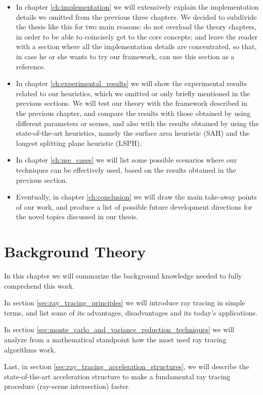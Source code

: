 \documentclass{PoliMi_MasterThesis}
\begin{document}
\begin{itemize}
\begin{itemize}
	\end{itemize}
	\item In chapter \ref{ch:implementation} we will extensively explain the implementation details we omitted from the previous three chapters. We decided to subdivide the thesis like this for two main reasons: do not overload the theory chapters, in order to be able to coincisely get to the core concepts; and leave the reader with a section where all the implementation details are concentrated, so that, in case he or she wants to try our framework, can use this section as a reference.
	\item In chapter \ref{ch:experimental_results} we will show the experimental results related to our heuristics, which we omitted or only briefly mentioned in the previous sections. We will test our theory with the framework described in the previous chapter, and compare the results with those obtained by using different parameters or scenes, and also with the results obtained by using the state-of-the-art heuristics, namely the surface area heuristic (SAH) and the longest splitting plane heuristic (LSPH).
	\item In chapter \ref{ch:use_cases} we will list some possible scenarios where our techniques can be effectively used, based on the results obtained in the previous section.
	\item Eventually, in chapter \ref{ch:conclusion} we will draw the main take-away points of our work, and produce a list of possible future development directions for the novel topics discussed in our thesis.
\end{itemize}


\chapter{Background Theory}
\label{ch:background_theory}
In this chapter we will summarize the background knowledge needed to fully comprehend this work.

In section \ref{sec:ray_tracing_principles} we will introduce ray tracing in simple terms, and list some of its advantages, disadvantages and its today's applications.

In section \ref{sec:monte_carlo_and_variance_reduction_techniques} we will analyze from a mathematical standpoint how the most used ray tracing algorithms work.

Last, in section \ref{sec:ray_tracing_acceleration_structures}, we will describe the state-of-the-art acceleration structure to make a fundamental ray tracing procedure (ray-scene intersection) faster.
\end{document}
